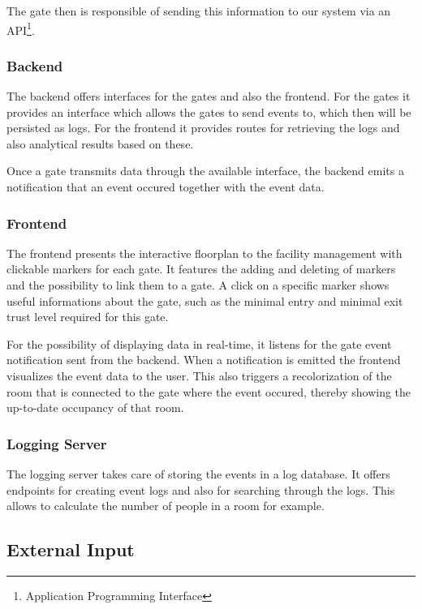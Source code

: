 The gate then is responsible of sending this information to our system via an API\footnote{Application Programming Interface}.


\subsubsection{Backend}
\label{Backend}

The backend offers interfaces for the gates and also the frontend. For the gates it provides an interface which allows the gates to send events to, which then will be persisted as logs.
For the frontend it provides routes for retrieving the logs and also analytical results based on these.

Once a gate transmits data through the available interface, the backend emits a notification that an event occured together with the event data. 


\subsubsection{Frontend}
\label{Frontend}

The frontend presents the interactive floorplan to the facility management with clickable markers for each gate.
It features the adding and deleting of markers and the possibility to link them to a gate.
A click on a specific marker shows useful informations about the gate, such as the minimal entry and minimal exit trust level required for this gate.

For the possibility of displaying data in real-time, it listens for the gate event notification sent from the backend. When a notification is emitted the frontend visualizes the event data to the user. This also triggers a recolorization of the room that is connected to the gate where the event occured, thereby showing the up-to-date occupancy of that room.

\subsubsection{Logging Server}
\label{Logging Server}

The logging server takes care of storing the events in a log database. It offers endpoints for creating event logs and also for searching through the logs. This allows to calculate the number of people in a room for example.

\subsection{External Input}

